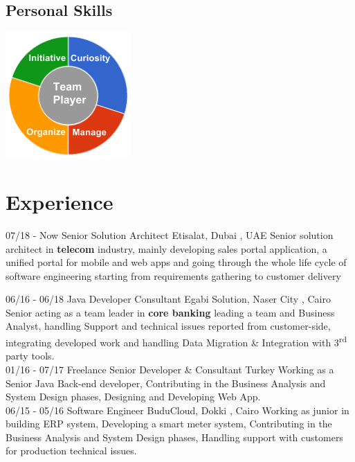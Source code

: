 \documentclass[]{friggeri-cv}
\begin{document}
\begin{aside}
  \section{Personal Skills}
    \includegraphics[scale=0.62]{img/personal.png}
\end{aside}


\section{Experience}
\begin{entrylist}
\entry
    {07/18 - Now}
    {Senior Solution Architect}
    {Etisalat, Dubai , UAE}
    {Senior solution architect in \textbf{telecom} industry, mainly developing sales portal application, a unified portal for mobile and web apps and going through the whole life cycle of software engineering starting from requirements gathering to customer delivery\\}
    
  \entry
    {06/16 - 06/18}
    {Java Developer Consultant}
    {Egabi Solution, Naser City , Cairo}
    {Senior acting as a team leader in \textbf{core banking} leading a team and Business Analyst, handling Support and technical issues reported from customer-side, integrating developed work and handling Data Migration \& Integration with 3\textsuperscript{rd} party tools.\\}
  \entry
    {01/16 - 07/17}
    {Freelance Senior Developer \& Consultant}
    {Turkey}
    {Working as a Senior Java Back-end developer, Contributing in the Business Analysis and System Design phases, Designing and Developing Web App.\\}
    \entry
    {06/15 - 05/16}
    {Software Engineer}
    {BuduCloud, Dokki , Cairo}
    {Working as junior in building ERP system, Developing a smart meter system, Contributing in the Business Analysis and System Design phases, Handling support with customers for production technical issues.\\}
\end{entrylist}
\end{document}
